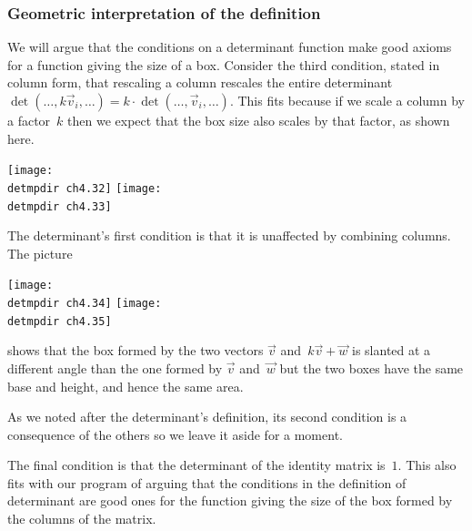 \begin{frame}\vspace*{-1ex}
  \frametitle{Geometric interpretation of the definition}
We will argue that the conditions on a determinant function make good
axioms for a function giving the size of a box.
Consider the third condition, stated in column form, that  
rescaling a column rescales the entire determinant
$\det(\ldots,k\vec{v}_i,\ldots)=k\cdot\det(\ldots,\vec{v}_i,\ldots)$.
This fits because if we scale a column by a factor~$k$ then 
we expect that the box size also
scales by that factor, as shown here. 
\begin{center}
  \texttt{[image: \\detmpdir ch4.32]}
  \qquad
  \texttt{[image: \\detmpdir ch4.33]}
\end{center}

\pause
The determinant's first condition is that it is unaffected by 
combining columns.
The picture 
\begin{center}
  \texttt{[image: \\detmpdir ch4.34]}
  \quad
  \texttt{[image: \\detmpdir ch4.35]}
\end{center}   
shows that the box
formed by the two vectors $\vec{v}$ and~$k\vec{v}+\vec{w}$ 
is slanted at a different angle than the one formed
by $\vec{v}$ and~$\vec{w}$ but the two boxes have
the same base and height, and hence the same area.
\end{frame}
\begin{frame}
As we noted after the determinant's definition, 
its second condition is a consequence of the 
others so we leave it aside for a moment.  

The final condition is that the determinant of the identity matrix is~$1$.
This also fits 
with our program of arguing that the conditions in the 
definition of determinant are good ones for the function
giving the size of the box formed by the columns of the matrix.
\end{frame}




